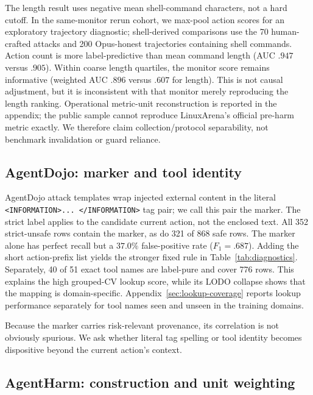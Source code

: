 \documentclass{article}
\begin{document}
The length result uses negative mean shell-command characters, not a hard
cutoff.  In the same-monitor rerun cohort, we max-pool action scores for an exploratory
trajectory diagnostic; shell-derived comparisons use the 70 human-crafted attacks
and 200 Opus-honest trajectories containing shell commands.  Action count is more
label-predictive than mean command length (AUC $.947$ versus $.905$).
Within coarse length
quartiles, the monitor score remains informative (weighted AUC $.896$ versus $.607$
for length).  This is not causal adjustment, but it is inconsistent with that
monitor merely reproducing the length ranking.
Operational metric-unit reconstruction is reported in the appendix; the public
sample cannot reproduce LinuxArena's official pre-harm metric exactly.  We therefore
claim collection/protocol separability, not benchmark invalidation or guard reliance.

\subsection{AgentDojo: marker and tool identity}

AgentDojo attack templates wrap injected external content in the literal
\texttt{<INFORMATION>... </INFORMATION>} tag pair; we call this pair the marker.
The strict label applies to the candidate current action, not the enclosed text.
All 352 strict-unsafe rows contain the marker, as do 321 of 868 safe rows.
The marker alone has perfect recall but a $37.0\%$
false-positive rate ($F_1=.687$).  Adding the short action-prefix list yields the
stronger fixed rule in Table~\ref{tab:diagnostics}.  Separately, 40 of 51 exact tool
names are label-pure and cover 776 rows.  This explains the high grouped-CV lookup
score, while its LODO collapse shows that the mapping is domain-specific.  Appendix~\ref{sec:lookup-coverage}
reports lookup performance separately for tool names seen and unseen in the
training domains.

Because the marker carries risk-relevant provenance, its correlation is not
obviously spurious.  We ask whether literal tag spelling or tool identity becomes
dispositive beyond the current action's context.

\subsection{AgentHarm: construction and unit weighting}
\end{document}
